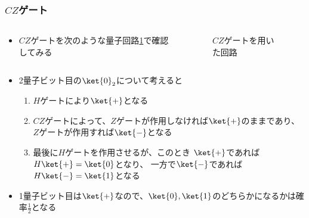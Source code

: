 \begin{frame}
  \frametitle{$CZ$ゲート}

  \begin{columns}
    \begin{column}{0.5\textwidth}
      \begin{itemize}
        \item $CZ$ゲートを次のような量子回路\ref{fig:cz_gate}で確認してみる
      \end{itemize}
    \end{column}
    \begin{column}{0.47\textwidth}
      \begin{figure}
        \caption{$CZ$ゲートを用いた回路}
        \label{fig:cz_gate}
      \end{figure}
    \end{column}
  \end{columns}

  \pause
  \begin{itemize}
    \item<+-> 2量子ビット目の$\ket{0}_2$について考えると
    \begin{enumerate}
      \item $H$ゲートにより$\ket{+}$となる \label{enum:cz_gate_1}

      \item $CZ$ゲートによって、$Z$ゲートが作用しなければ$\ket{+}$のままであり、
      $Z$ゲートが作用すれば$\ket{-}$となる \label{enum:cz_gate_2}

      \item 最後に$H$ゲートを作用させるが、このとき
      $\ket{+}$であれば$H\ket{+} = \ket{0}$となり、
      一方で$\ket{-}$であれば$H\ket{-} = \ket{1}$となる \label{enum:cz_gate_3}
    \end{enumerate}

    \item<+-> 1量子ビット目は$\ket{+}$なので、$\ket{0}, \ket{1}$のどちらかになるかは確率$\frac{1}{2}$となる
  \end{itemize}
\end{frame}

